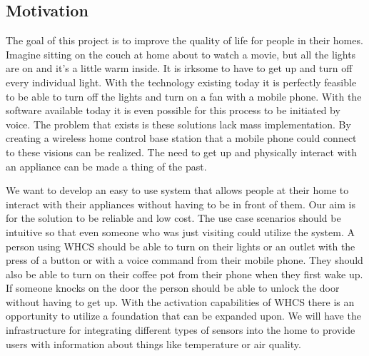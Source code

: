 
\subsection{Motivation}
The goal of this project is to improve the quality of life for people in their
homes. Imagine sitting on the couch at home about to watch a movie, but all the
lights are on and it{}'s a little warm inside. It is irksome to have to get up
and turn off every individual light. With the technology existing today it is
perfectly feasible to be able to turn off the lights and turn on a fan with a
mobile phone. With the software available today it is even possible for this
process to be initiated by voice. The problem that exists is these solutions
lack mass implementation. By creating a wireless home control base station that
a mobile phone could connect to these visions can be realized. The need to get
up and physically interact with an appliance can be made a thing of the past.

We want to develop an easy to use system that allows people at their home to
interact with their appliances without having to be in front of them. Our aim
is for the solution to be reliable and low cost. The use case scenarios should
be intuitive so that even someone who was just visiting could utilize the
system. A person using WHCS should be able to turn on their lights or an outlet
with the press of a button or with a voice command from their mobile phone.
They should also be able to turn on their coffee pot from their phone when they
first wake up. If someone knocks on the door the person should be able to
unlock the door without having to get up. With the activation capabilities of
WHCS there is an opportunity to utilize a foundation that can be expanded upon.
We will have the infrastructure for integrating different types of sensors into
the home to provide users with information about things like temperature or air
quality.

